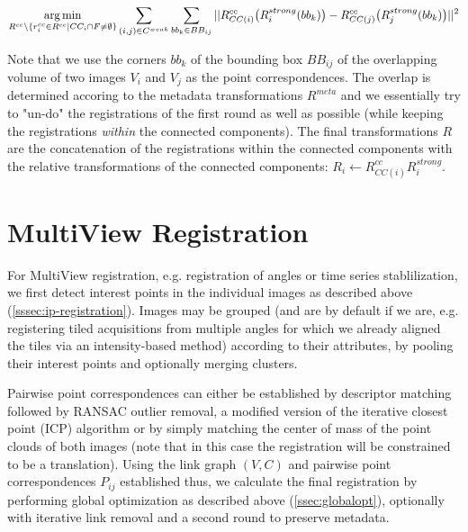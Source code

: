\begin{equation}
\label{eq:globalopt-eq4}
\operatorname*{arg\,min}_{R^{cc} \setminus \{ r^{cc}_{i} \in R^{cc} | CC_i \cap F \neq \emptyset \}} \sum_{(i,j) \in C^{weak}} \sum_{bb_{k} \in BB_{ij}} || R^{cc}_{CC(i)}\big( R^{strong}_{i}( bb_{k})\big) -  R^{cc}_{CC(j)}\big( R^{strong}_{j}( bb_{k}) \big) ||^2 
\end{equation}

Note that we use the corners $bb_k$ of the bounding box $BB_{ij}$ of the overlapping volume of two images $V_i$ and $V_j$ as the point correspondences. The overlap is determined accoring to the metadata transformations $R^{meta}$ and we essentially try to "un-do" the registrations of the first round as well as possible (while keeping the registrations \emph{within} the connected components). The final transformations $R$ are the concatenation of the registrations within the connected components with the relative transformations of the connected components: $R_{i} \leftarrow R^{cc}_{CC(i)} R^{strong}_{i}$.

\section{MultiView Registration}

For MultiView registration, e.g. registration of angles or time series stablilization, we first detect interest points in the individual images as described above (\ref{sssec:ip-registration}). Images may be grouped (and are by default if we are, e.g. registering tiled acquisitions from multiple angles for which we already aligned the tiles via an intensity-based method) according to their attributes, by pooling their interest points and optionally merging clusters.

Pairwise point correspondences can either be established by descriptor matching followed by RANSAC outlier removal, a modified version of the iterative closest point (ICP) algorithm or by simply matching the center of mass of the point clouds of both images (note that in this case the registration will be constrained to be a translation). Using the link graph $(V,C)$ and pairwise point correspondences $P_{ij}$ established thus, we calculate the final registration by performing global optimization as described above (\ref{ssec:globalopt}), optionally with iterative link removal and a second round to preserve metadata.

